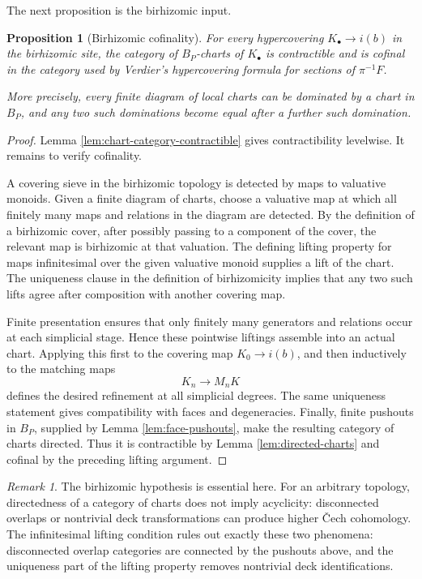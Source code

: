 \documentclass{article}
\newtheorem{proposition}[theorem]{Proposition}
\theoremstyle{definition}
\theoremstyle{remark}
\newtheorem{remark}[theorem]{Remark}
\begin{document}
The next proposition is the birhizomic input.

\begin{proposition}[Birhizomic cofinality]\label{prop:birhizomic-cofinality}
For every hypercovering \(K_\bullet\to i(b)\) in the birhizomic site, the category of \(B_P\)-charts of \(K_\bullet\) is contractible and is cofinal in the category used by Verdier's hypercovering formula for sections of \(\pi^{-1}F\).

More precisely, every finite diagram of local charts can be dominated by a chart in \(B_P\), and any two such dominations become equal after a further such domination.
\end{proposition}

\begin{proof}
Lemma \ref{lem:chart-category-contractible} gives contractibility levelwise.  It remains to verify cofinality.

A covering sieve in the birhizomic topology is detected by maps to valuative monoids.  Given a finite diagram of charts, choose a valuative map at which all finitely many maps and relations in the diagram are detected.  By the definition of a birhizomic cover, after possibly passing to a component of the cover, the relevant map is birhizomic at that valuation.  The defining lifting property for maps infinitesimal over the given valuative monoid supplies a lift of the chart.  The uniqueness clause in the definition of birhizomicity implies that any two such lifts agree after composition with another covering map.

Finite presentation ensures that only finitely many generators and relations occur at each simplicial stage.  Hence these pointwise liftings assemble into an actual chart.  Applying this first to the covering map \(K_0\to i(b)\), and then inductively to the matching maps
\[
K_n\longrightarrow M_nK
\]
defines the desired refinement at all simplicial degrees.  The same uniqueness statement gives compatibility with faces and degeneracies.  Finally, finite pushouts in \(B_P\), supplied by Lemma \ref{lem:face-pushouts}, make the resulting category of charts directed.  Thus it is contractible by Lemma \ref{lem:directed-charts} and cofinal by the preceding lifting argument.
\end{proof}

\begin{remark}
The birhizomic hypothesis is essential here.  For an arbitrary topology, directedness of a category of charts does not imply acyclicity: disconnected overlaps or nontrivial deck transformations can produce higher Čech cohomology.  The infinitesimal lifting condition rules out exactly these two phenomena: disconnected overlap categories are connected by the pushouts above, and the uniqueness part of the lifting property removes nontrivial deck identifications.
\end{remark}
\end{document}
